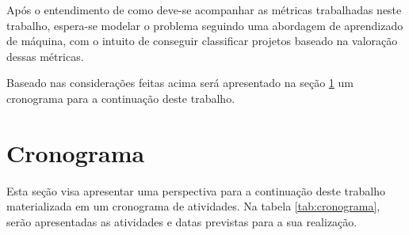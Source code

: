Após o entendimento de como deve-se acompanhar as métricas trabalhadas neste
trabalho, espera-se modelar o problema seguindo uma abordagem de aprendizado de
máquina, com o intuito de conseguir classificar projetos baseado na valoração
dessas métricas.

Baseado nas considerações feitas acima será apresentado na seção
\ref{sec:cronograma} um cronograma para a continuação deste trabalho.

\section{Cronograma} \label{sec:cronograma}

Esta seção visa apresentar uma perspectiva para a continuação deste trabalho
materializada em um cronograma de atividades. Na tabela \ref{tab:cronograma},
serão apresentadas as atividades e datas previstas para a sua realização.

\begin{table}[h]
\caption{Cronograma}
\label{tab:cronograma}
\end{table}

